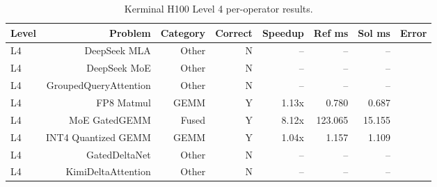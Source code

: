 \begin{table}[t]
\centering
\small
\caption{Kerminal H100 Level 4 per-operator results.}
\label{tab:kerminal-l4}
\begin{tabular}{lrrrrrrr}
\toprule
Level & Problem & Category & Correct & Speedup & Ref ms & Sol ms & Error \\
\midrule
L4 & DeepSeek MLA & Other & N & -- & -- & -- &  \\
L4 & DeepSeek MoE & Other & N & -- & -- & -- &  \\
L4 & GroupedQueryAttention & Other & N & -- & -- & -- &  \\
L4 & FP8 Matmul & GEMM & Y & 1.13x & 0.780 & 0.687 &  \\
L4 & MoE GatedGEMM & Fused & Y & 8.12x & 123.065 & 15.155 &  \\
L4 & INT4 Quantized GEMM & GEMM & Y & 1.04x & 1.157 & 1.109 &  \\
L4 & GatedDeltaNet & Other & N & -- & -- & -- &  \\
L4 & KimiDeltaAttention & Other & N & -- & -- & -- &  \\
\bottomrule
\end{tabular}
\end{table}
